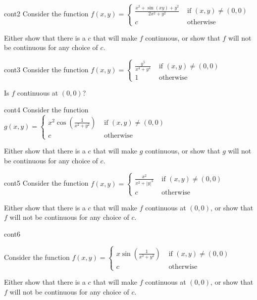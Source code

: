 \begin{problem}{cont2}
Consider the function  $f(x,y) = \left\{
		\begin{array}{ll}
			\frac{x^2  +\sin(xy)+y^2}{2x^2 + y^2} & \text{ if } (x,y) \neq (0,0) \\
			c & \text{ otherwise } 
		\end{array}
		\right.$
		
		Either show that there is a $c$ that will make $f$ continuous, or show that $f$ will not be continuous for any choice of $c$.
\end{problem}

\begin{problem}{cont3}
Consider the function $f(x,y) = \left\{
		\begin{array}{ll}
			\frac{y^5}{x^4 + y^4} & \text{ if } (x,y) \neq (0,0) \\
			1 & \text{ otherwise } 
		\end{array}
		\right.$
		
		Is $f$ continuous at $(0,0)$?
\end{problem}

\begin{problem}{cont4}
Consider the function  $g(x,y) = \left\{
		\begin{array}{ll}
			x^2\cos(\frac{1}{x^2 + y^2}) & \text{ if } (x,y) \neq (0,0) \\
			c & \text{ otherwise } 
		\end{array}
		\right.$
		
		Either show that there is a $c$ that will make $g$ continuous, or show that $g$ will not be continuous for any choice of $c$.
\end{problem}

\begin{problem}{cont5}
Consider the function  $f(x,y) = \left\{
		\begin{array}{ll}
			\frac{x^2}{x^2 + |y|^3} & \text{ if } (x,y) \neq (0,0) \\
			c & \text{ otherwise } 
		\end{array}
		\right.$
		
		Either show that there is a $c$ that will make $f$ continuous at $(0,0)$, or show that $f$ will not be continuous for any choice of $c$.
\end{problem}

\begin{problem}{cont6}

Consider the function  $f(x,y) = \left\{
		\begin{array}{ll}
			x\sin(\frac{1}{x^2 + y^2}) & \text{ if } (x,y) \neq (0,0) \\
			c & \text{ otherwise } 
		\end{array}
		\right.$
		
		Either show that there is a $c$ that will make $f$ continuous at $(0,0)$, or show that $f$ will not be continuous for any choice of $c$.

\end{problem}

